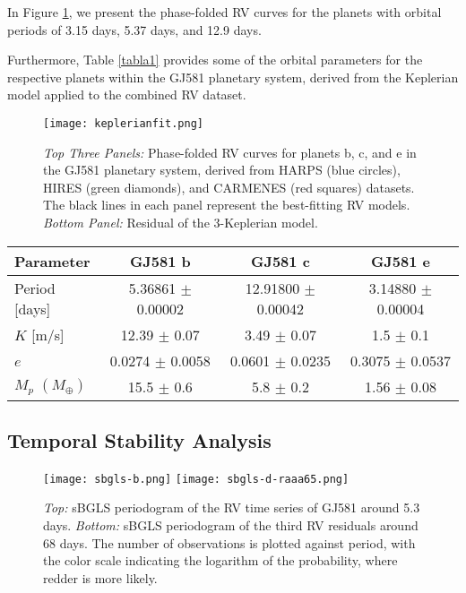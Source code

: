 \documentclass[baaa]{baaa}
\begin{document}
In Figure \ref{fig:keplerian}, we present the phase-folded RV curves for the planets with orbital periods of 3.15 days, 5.37 days, and 12.9 days.

Furthermore, Table \ref{tabla1} provides some of the orbital parameters for the respective planets within the GJ581 planetary system, derived from the Keplerian model applied to the combined RV dataset.

\begin{figure}[t]
    \centering
    \texttt{[image: keplerianfit.png]}
    \caption{\emph{Top Three Panels:} Phase-folded RV curves for planets b, c, and e in the GJ581 planetary system, derived from HARPS (blue circles), HIRES (green diamonds), and CARMENES (red squares) datasets. The black lines in each panel represent the best-fitting RV models. \emph{Bottom Panel:} Residual of the 3-Keplerian model.}
    \label{fig:keplerian}
\end{figure}

\begin{table*}[!t]
\centering
\caption{Orbital period ($P$), Semiamplitude ($K$), eccentricity ($e$), and mass ($M_p$) values of each confirmed planet in the GJ581 system, derived from the 3-Keplerian model using the latest dataset.}
\begin{tabular}{lccc}
\hline\hline\noalign{\smallskip}
\!\!Parameter & \!\!\!\!\textbf{GJ581 b} & \!\!\!\!\textbf{GJ581 c}& \!\!\!\!\textbf{GJ581 e}\\
\hline\noalign{\smallskip}
\!\!Period\,\,[days] & 5.36861 $\pm$ 0.00002 & 12.91800 $\pm$ 0.00042  & 3.14880 $\pm$ 0.00004 \\
\!\!$K$\,\,[m/s] & 12.39 $\pm$ 0.07 & 3.49 $\pm$ 0.07 & 1.5 $\pm$ 0.1\\
\!\!$e$\,\, & 0.0274 $\pm$ 0.0058 & 0.0601 $\pm$ 0.0235 & 0.3075 $\pm$ 0.0537\\
\!\!$M_p\,\,(M_{\oplus})$ &15.5 $\pm$ 0.6 & 5.8 $\pm$ 0.2 & 1.56 $\pm$ 0.08 \\
\hline
\end{tabular}
\label{tabla1}
\end{table*}

\subsection{Temporal Stability Analysis}

\begin{figure}[htbp]
  \centering
    \texttt{[image: sbgls-b.png]}
    \texttt{[image: sbgls-d-raaa65.png]}
  \caption{\emph{Top:} sBGLS periodogram of the RV time series of GJ581 around 5.3 days. \emph{Bottom:} sBGLS periodogram of the third RV residuals around 68 days. The number of observations is plotted against period, with the color scale indicating the logarithm of the probability, where redder is more likely.}
  \label{fig:sgls}
\end{figure}
\end{document}
